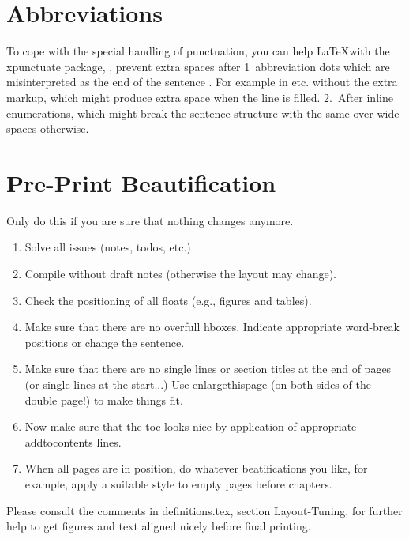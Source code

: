 \section{Abbreviations}
\label{sec:abbreviations}

To cope with the special handling of punctuation, you can help \LaTeX with the xpunctuate package, \ie, prevent extra spaces after 1\xperiod{}~abbreviation dots which are misinterpreted as the end of the sentence \etc. For example in etc. without the extra markup, which might produce extra space when the line is filled. 2.~After inline enumerations, which might break the sentence-structure with the same over-wide spaces otherwise.


\section{Pre-Print Beautification}
\label{sec:pre-print-beaut}

Only do this if you are sure that nothing changes anymore.

\begin{enumerate}
\item Solve all issues (notes, todos, etc.)
\item Compile without draft notes (otherwise the layout may change).
\item Check the positioning of all floats (e.g., figures and tables).
\item Make sure that there are no overfull hboxes. Indicate appropriate word-break positions or change the sentence.
\item Make sure that there are no single lines or section titles at the end of pages (or single lines at the start...) Use enlargethispage (on both sides of the double page!) to make things fit.
\item Now make sure that the toc looks nice by application of appropriate addtocontents lines.
\item When all pages are in position, do whatever beatifications you like, for example, apply a suitable style to empty pages before chapters.
\end{enumerate}

Please consult the comments in definitions.tex, section Layout-Tuning, for further help to get figures and text aligned nicely before final printing.

\enlargethispage{4\baselineskip}


